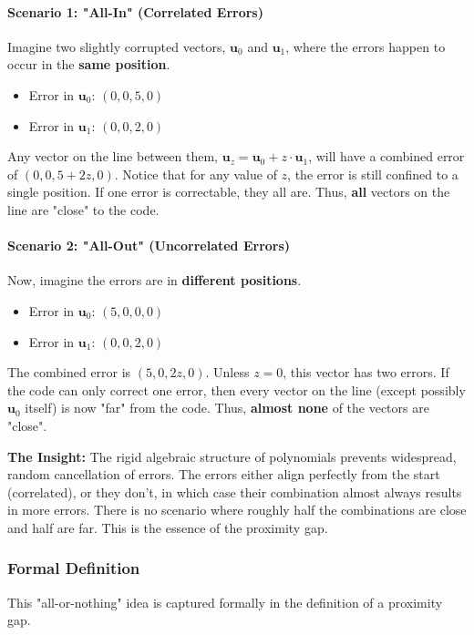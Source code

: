 \documentclass{article}
\begin{document}
\begin{tcolorbox}[breakable, title={Analogy: The Proximity Gap}]
\paragraph{Scenario 1: "All-In" (Correlated Errors)}
Imagine two slightly corrupted vectors, $\mathbf{u}_0$ and $\mathbf{u}_1$, where the errors happen to occur in the \textbf{same position}.
\begin{itemize}
    \item Error in $\mathbf{u}_0$: $(0, 0, 5, 0)$
    \item Error in $\mathbf{u}_1$: $(0, 0, 2, 0)$
\end{itemize}
Any vector on the line between them, $\mathbf{u}_z = \mathbf{u}_0 + z \cdot \mathbf{u}_1$, will have a combined error of $(0, 0, 5+2z, 0)$. Notice that for any value of $z$, the error is still confined to a single position. If one error is correctable, they all are. Thus, \textbf{all} vectors on the line are "close" to the code.

\hrulefill

\paragraph{Scenario 2: "All-Out" (Uncorrelated Errors)}
Now, imagine the errors are in \textbf{different positions}.
\begin{itemize}
    \item Error in $\mathbf{u}_0$: $(5, 0, 0, 0)$
    \item Error in $\mathbf{u}_1$: $(0, 0, 2, 0)$
\end{itemize}
The combined error is $(5, 0, 2z, 0)$. Unless $z=0$, this vector has two errors. If the code can only correct one error, then every vector on the line (except possibly $\mathbf{u}_0$ itself) is now "far" from the code. Thus, \textbf{almost none} of the vectors are "close".

\textbf{The Insight:} The rigid algebraic structure of polynomials prevents widespread, random cancellation of errors. The errors either align perfectly from the start (correlated), or they don't, in which case their combination almost always results in more errors. There is no scenario where roughly half the combinations are close and half are far. This is the essence of the proximity gap.
\end{tcolorbox}

\subsubsection{Formal Definition}
This "all-or-nothing" idea is captured formally in the definition of a proximity gap.
\end{document}
